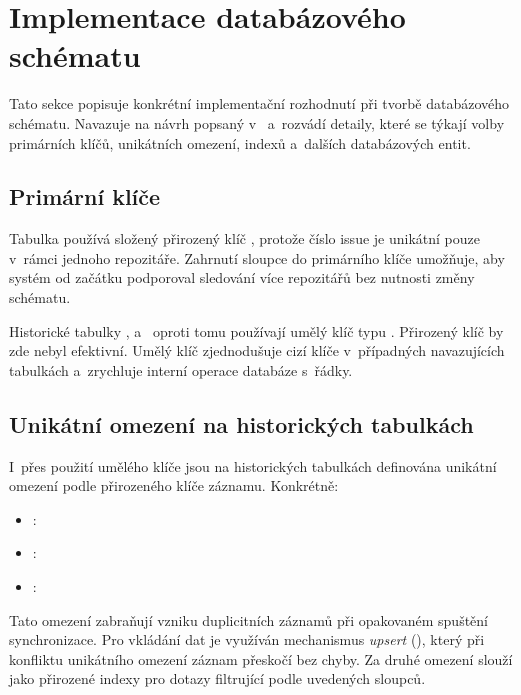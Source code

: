 \section{Implementace databázového schématu}
\label{sec:implementation:db_scheme}

Tato sekce popisuje konkrétní implementační rozhodnutí při tvorbě databázového schématu. Navazuje na návrh popsaný v~ a~rozvádí detaily, které se týkají volby primárních klíčů, unikátních omezení, indexů a~dalších databázových entit.

\subsection{Primární klíče}
\label{subsec:implementation:db_scheme:primary_keys}

Tabulka  používá složený přirozený klíč , protože číslo issue je unikátní pouze v~rámci jednoho repozitáře. Zahrnutí sloupce  do primárního klíče umožňuje, aby systém od začátku podporoval sledování více repozitářů bez nutnosti změny schématu.

Historické tabulky ,  a~ oproti tomu používají umělý klíč  typu . Přirozený klíč by zde nebyl efektivní. Umělý klíč zjednodušuje cizí klíče v~případných navazujících tabulkách a~zrychluje interní operace databáze s~řádky.

\subsection{Unikátní omezení na historických tabulkách}
\label{subsec:implementation:db_scheme:unique_constraints}

I~přes použití umělého klíče jsou na historických tabulkách definována unikátní omezení podle přirozeného klíče záznamu. Konkrétně:

\begin{itemize}
  \item {}: 
  \item {}: 
  \item {}: 
\end{itemize}

Tato omezení zabraňují vzniku duplicitních záznamů při opakovaném spuštění synchronizace. Pro vkládání dat je využíván mechanismus \emph{upsert} (), který při konfliktu unikátního omezení záznam přeskočí bez chyby. Za druhé omezení slouží jako přirozené indexy pro dotazy filtrující podle uvedených sloupců.


